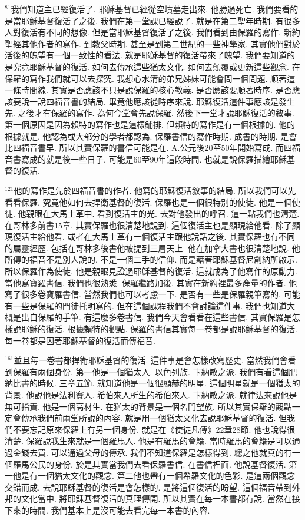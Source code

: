 \documentclass{book}
\begin{document}
$^{81}$我們知道主已經復活了.
耶穌基督已經從空墳墓走出來.
他勝過死亡.
我們要看的是當耶穌基督復活了之後.
我們在第一堂課已經說了.
就是在第二聖年時期.
有很多人對復活有不同的想像.
但是當耶穌基督復活了之後.
我們看到由保羅的寫作.
新約聖經其他作者的寫作.
到教父時期.
甚至是到第二世紀的一些神學家.
其實他們對於活後的魄望有一個一致性的看法.
就是耶穌基督的復活帶來了魄望.
我們要知道的是究竟耶穌基督的復活.
如何去傳承這些猶太文化.
如何去顛覆或更新這些觀念.
在保羅的寫作我們就可以去探究.
我想心水清的弟兄姊妹可能會問一個問題.
順著這一條時間線.
其實是否應該不只是說保羅的核心教義.
是否應該要順著時序.
是否應該要說一說四福音書的結局.
畢竟他應該從時序來說.
耶穌復活這件事應該是發生先.
之後才有保羅的寫作.
為何今堂會先說保羅.
然後下一堂才說耶穌復活的敘事.
第一個原因是因為賴特的寫作也是這樣鋪排.
但賴特的寫作是有一個根據的.
他的根據就是.
他認為或大部分的學者都認為.
保羅書信的寫作時期.
成書的時期.
是會比四福音書早.
所以其實保羅的書信可能是在.
A.公元後20至50年開始寫成.
而四福音書寫成的就是後一些日子.
可能是60至90年這段時間.
也就是說保羅描繪耶穌基督的復活.

$^{121}$他的寫作是先於四福音書的作者.
他寫的耶穌復活敘事的結局.
所以我們可以先看看保羅.
究竟他如何去捍衛基督的復活.
保羅也是一個很特別的使徒.
他是一個使徒.
他親眼在大馬士革中.
看到復活主的光.
去對他發出的呼召.
這一點我們也清楚.
在哥林多前書15章.
其實保羅也很清楚地說到.
這個復活主也是顯現給他看.
除了顯現復活主給他看.
或者在大馬士革有一個復活主跟他說話之後.
其實保羅也有不同的屬靈經歷.
包括在哥林多後書他被提到三層天上.
他在加拿大書也很清楚地說.
他所傳的福音不是別人說的.
不是一個二手的信仰.
而是藉著耶穌基督尼創納所啟示.
所以保羅作為使徒.
他是親眼見證過耶穌基督的復活.
這就成為了他寫作的原動力.
當他寫寶羅書信.
我們也很熟悉.
保羅繼路加後.
其實在新約裡最多產量的作者.
他寫了很多卷寶羅書信.
當然我們也可以考慮一下.
是否有一些是保羅親筆寫的.
可能有一些是保羅的門徒托明寫的.
但在這個課程我們不會討論這件事.
我們也知道大概是出自保羅的手筆.
有這麼多卷書信.
我們今天會看看在這些書信.
其實保羅是怎樣說耶穌的復活.
根據賴特的觀點.
保羅的書信其實每一卷都是說耶穌基督的復活.
每一卷都是因著耶穌基督的復活而傳福音.

$^{161}$並且每一卷書都捍衛耶穌基督的復活.
這件事是會怎樣改寫歷史.
當然我們會看到保羅有兩個身份.
第一他是一個猶太人.
以色列族.
卞納敏之派.
我們有看這個肥納比書的時候.
三章五節.
就知道他是一個很顯赫的明星.
這個明星就是一個猶太的背景.
他說他是法利賽人.
希伯來人所生的希伯來人.
卞納敏之派.
就律法來說他是無可指責.
他是一個高材生.
在猶太的背景是一個名門望族.
所以其實保羅的觀點一定會傳承我們前兩堂所說的內容.
就是用一個猶太文化去說耶穌基督的復活.
但我們不要忘記原來保羅上有另一個身份.
就是在《使徒凡傳》22章28節.
他也說得很清楚.
保羅說我生來就是一個羅馬人.
他是有羅馬的會籍.
當時羅馬的會籍是可以通過金錢去買.
可以通過父母的傳承.
我們不知道保羅是怎樣得到.
總之他就真的有一個羅馬公民的身份.
於是其實當我們去看保羅書信.
在書信裡面.
他說基督復活.
第一他是有一個猶太文化的觀念.
第二他也帶有一個希羅文化的色彩.
是這兩個觀念交錯而成.
去說耶穌基督的復活是會怎樣的.
是將這個復活的盼望.
這個福音帶到外邦的文化當中.
將耶穌基督復活的真理傳開.
所以其實在每一本書都有說.
當然在接下來的時間.
我們基本上是沒可能去看完每一本書的內容.
\end{document}
